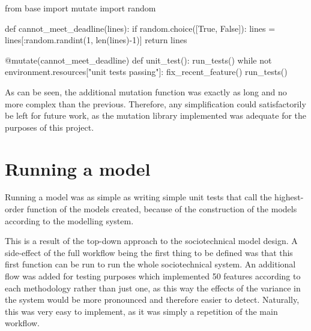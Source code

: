 \begin{pyglist}[language = python, encoding = utf8]
from base import mutate
import random

def cannot_meet_deadline(lines):
    if random.choice([True, False]):
        lines = lines[:random.randint(1, len(lines)-1)]
    return lines

@mutate(cannot_meet_deadline)
def unit_test():
    run_tests()
    while not environment.resources["unit tests passing"]:
        fix_recent_feature()
        run_tests()
\end{pyglist}\par
As can be seen, the additional mutation function was exactly as long and no more complex than the previous. Therefore, any simplification could satisfactorily be left for future work, as the mutation library implemented was adequate for the purposes of this project.\par

\section{Running a model}
Running a model was as simple as writing simple unit tests that call the highest-order function of the models created, because of the construction of the models according to the modelling system. \par
This is a result of the top-down approach to the sociotechnical model design. A side-effect of the full workflow being the first thing to be defined was that this first function can be run to run the whole sociotechnical system. An additional flow was added for testing purposes which implemented 50 features according to each methodology rather than just one, as this way the effects of the variance in the system would be more pronounced and therefore easier to detect. Naturally, this was very easy to implement, as it was simply a repetition of the main workflow.\par

